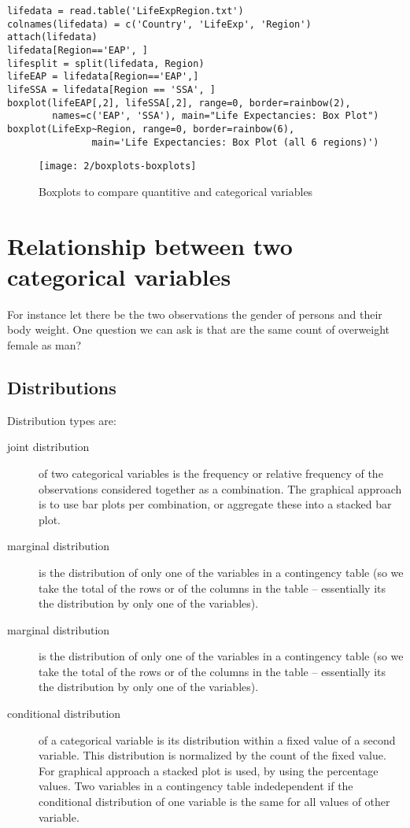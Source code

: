 \begin{verbatim}
lifedata = read.table('LifeExpRegion.txt')
colnames(lifedata) = c('Country', 'LifeExp', 'Region')
attach(lifedata)
lifedata[Region=='EAP', ]
lifesplit = split(lifedata, Region)
lifeEAP = lifedata[Region=='EAP',]
lifeSSA = lifedata[Region == 'SSA', ]
boxplot(lifeEAP[,2], lifeSSA[,2], range=0, border=rainbow(2), 
        names=c('EAP', 'SSA'), main="Life Expectancies: Box Plot")
boxplot(LifeExp~Region, range=0, border=rainbow(6), 
               main='Life Expectancies: Box Plot (all 6 regions)')
\end{verbatim}

\begin{figure}[htbp]
\label{fig:boxplots}
\caption{Boxplots to compare quantitive and categorical variables}
\texttt{[image: 2/boxplots-boxplots]}
\end{figure}

\section{Relationship between two categorical variables}

For instance let there be the two observations the gender of persons and their
body weight. One question we can ask is that are the same count of overweight
female as man?

\subsection{Distributions}

Distribution types are:

\begin{description}
  \item[joint distribution] of two categorical variables is the frequency or
  relative frequency of the observations considered together as a combination.
  The graphical approach is to use bar plots per combination, or aggregate these
  into a stacked bar plot.
  \item[marginal distribution] is the distribution of only one of the variables
  in a contingency table (so we take the total of the rows or of the columns in
  the table -- essentially its the distribution by only one of the variables).
  \item[marginal distribution] is the distribution of only one of the variables
  in a contingency table (so we take the total of the rows or of the columns in
  the table -- essentially its the distribution by only one of the variables).
  \item[conditional distribution] of a categorical variable is its distribution
  within a fixed value of a second variable. This distribution is normalized by
  the count of the fixed value. For graphical approach a stacked plot is used,
  by using the percentage values. Two variables in a contingency table
  indedependent if the conditional distribution of one variable is the same for
  all values of other variable.
 \end{description}

